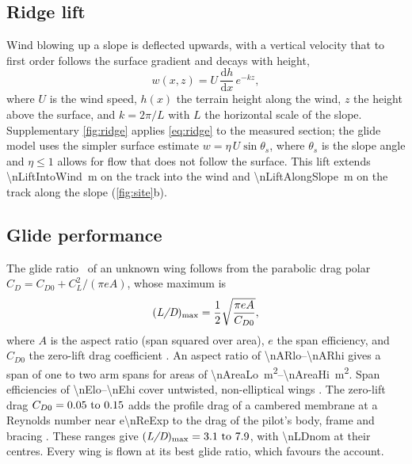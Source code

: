 \subsection{Ridge lift}

Wind blowing up a slope is deflected upwards, with a vertical velocity that to first order
follows the surface gradient and decays with height,
\begin{equation}
  w(x,z) = U\,\frac{\mathrm{d}h}{\mathrm{d}x}\,e^{-kz},
  \label{eq:ridge}
\end{equation}
where \(U\) is the wind speed, \(h(x)\) the terrain height along the wind, \(z\) the height
above the surface, and \(k = 2\pi/L\) with \(L\) the horizontal scale of the slope.
Supplementary \cref{fig:ridge} applies \cref{eq:ridge} to the measured section; the glide
model uses the simpler surface estimate \(w = \eta\,U\sin\theta_s\), where
\(\theta_s\) is the slope angle and \(\eta \le 1\) allows for flow that does not follow the
surface.
This lift extends \SI{\nLiftIntoWind}{\meter} on the track into the wind and
\SI{\nLiftAlongSlope}{\meter} on the track along the slope (\cref{fig:site}b).

\subsection{Glide performance}

The glide ratio \LD\ of an unknown wing follows from the parabolic drag polar
\(C_D = C_{D0} + C_L^2/(\pi e A)\), whose maximum is
\begin{equation}
  (\textit{L/D})_\mathrm{max} = \frac{1}{2}\sqrt{\frac{\pi e A}{C_{D0}}},
  \label{eq:polar}
\end{equation}
where \(A\) is the aspect ratio (span squared over area), \(e\) the span efficiency, and
\(C_{D0}\) the zero-lift drag coefficient \autocite{drela2014flight}.
An aspect ratio of \numrange{\nARlo}{\nARhi} gives a span of one to two arm spans for areas
of \SIrange{\nAreaLo}{\nAreaHi}{\meter\squared}.
Span efficiencies of \numrange{\nElo}{\nEhi} cover untwisted, non-elliptical wings
\autocite{drela2014flight}.
The zero-lift drag \(C_{D0} = \numrange{\nCDzlo}{\nCDzhi}\) adds the profile drag of a
cambered membrane at a Reynolds number near \num{e\nReExp}
\autocite{lissaman1983lowre,hoerner1985lift} to the drag of the pilot's body, frame and
bracing \autocite{hoerner1965drag}.
These ranges give \((\LD)_\mathrm{max} = \numrange{\nLDlo}{\nLDhi}\), with \num{\nLDnom}
at their centres.
Every wing is flown at its best glide ratio, which favours the account.

